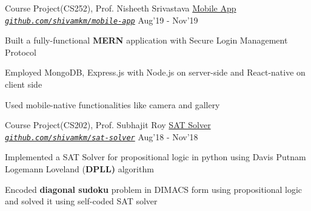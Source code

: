 \begin{cventries}
{\begin{cvitems}
	\end{cvitems}
}
\cventry
{Course Project(CS252), Prof. Nisheeth Srivastava}
{\href{https://github.com/shivamkm/mobile-app}{Mobile App}}
{\emph{\texttt{\href{https://github.com/shivamkm/mobile-app}{github.com/shivamkm/mobile-app}}}}
{Aug'19 - Nov'19}
{
	\begin{cvitems}
		\item Built a fully-functional \textbf{MERN} application with Secure Login Management Protocol
		\item Employed MongoDB, Express.js with Node.js on server-side and React-native on client side
		\item Used mobile-native functionalities like camera and gallery
	\end{cvitems}
}


\cventry
{Course Project(CS202), Prof. Subhajit Roy}
{\href{https://github.com/shivamkm/sat-solver}{SAT Solver}}
{\emph{\texttt{\href{https://github.com/shivamkm/sat-solver}{github.com/shivamkm/sat-solver}}}}
{Aug'18 - Nov'18}
{
	\begin{cvitems}
		\item Implemented a SAT Solver for propositional logic in python using Davis Putnam Logemann Loveland (\textbf{DPLL)} algorithm
		\item Encoded \textbf{diagonal sudoku} problem in DIMACS form using propositional logic and solved it using self-coded SAT solver
	\end{cvitems}
}
\end{cventries}
